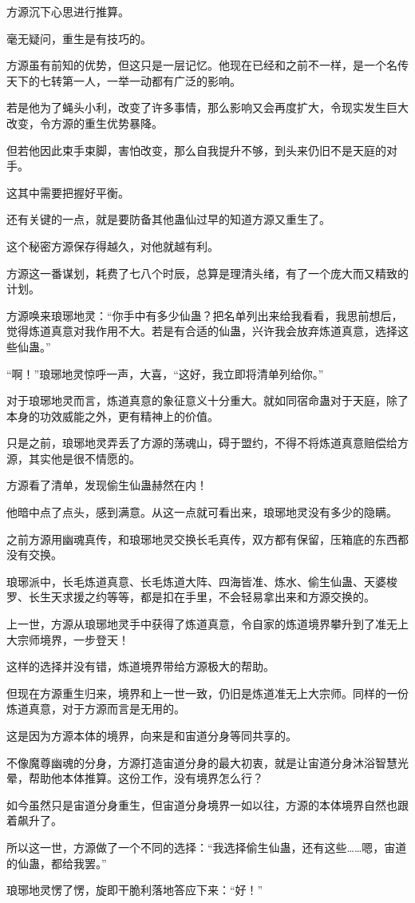 \begin{this_body}
方源沉下心思进行推算。

毫无疑问，重生是有技巧的。

方源虽有前知的优势，但这只是一层记忆。他现在已经和之前不一样，是一个名传天下的七转第一人，一举一动都有广泛的影响。

若是他为了蝇头小利，改变了许多事情，那么影响又会再度扩大，令现实发生巨大改变，令方源的重生优势暴降。

但若他因此束手束脚，害怕改变，那么自我提升不够，到头来仍旧不是天庭的对手。

这其中需要把握好平衡。

还有关键的一点，就是要防备其他蛊仙过早的知道方源又重生了。

这个秘密方源保存得越久，对他就越有利。

方源这一番谋划，耗费了七八个时辰，总算是理清头绪，有了一个庞大而又精致的计划。

方源唤来琅琊地灵：“你手中有多少仙蛊？把名单列出来给我看看，我思前想后，觉得炼道真意对我作用不大。若是有合适的仙蛊，兴许我会放弃炼道真意，选择这些仙蛊。”

“啊！”琅琊地灵惊呼一声，大喜，“这好，我立即将清单列给你。”

对于琅琊地灵而言，炼道真意的象征意义十分重大。就如同宿命蛊对于天庭，除了本身的功效威能之外，更有精神上的价值。

只是之前，琅琊地灵弄丢了方源的荡魂山，碍于盟约，不得不将炼道真意赔偿给方源，其实他是很不情愿的。

方源看了清单，发现偷生仙蛊赫然在内！

他暗中点了点头，感到满意。从这一点就可看出来，琅琊地灵没有多少的隐瞒。

之前方源用幽魂真传，和琅琊地灵交换长毛真传，双方都有保留，压箱底的东西都没有交换。

琅琊派中，长毛炼道真意、长毛炼道大阵、四海皆准、炼水、偷生仙蛊、天婆梭罗、长生天求援之约等等，都是扣在手里，不会轻易拿出来和方源交换的。

上一世，方源从琅琊地灵手中获得了炼道真意，令自家的炼道境界攀升到了准无上大宗师境界，一步登天！

这样的选择并没有错，炼道境界带给方源极大的帮助。

但现在方源重生归来，境界和上一世一致，仍旧是炼道准无上大宗师。同样的一份炼道真意，对于方源而言是无用的。

这是因为方源本体的境界，向来是和宙道分身等同共享的。

不像魔尊幽魂的分身，方源打造宙道分身的最大初衷，就是让宙道分身沐浴智慧光晕，帮助他本体推算。这份工作，没有境界怎么行？

如今虽然只是宙道分身重生，但宙道分身境界一如以往，方源的本体境界自然也跟着飙升了。

所以这一世，方源做了一个不同的选择：“我选择偷生仙蛊，还有这些……嗯，宙道的仙蛊，都给我罢。”

琅琊地灵愣了愣，旋即干脆利落地答应下来：“好！”

\end{this_body}

